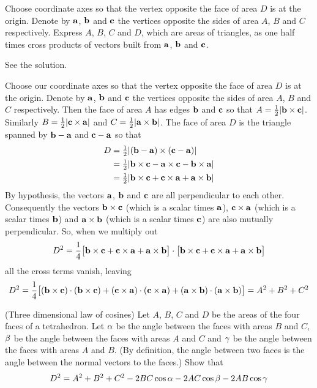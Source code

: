 \begin{hint}
Choose coordinate axes so that the vertex opposite
the face of area $D$ is at the origin. Denote  by $\mathbf{a}$, $\mathbf{b}$ and
$\mathbf{c}$ the vertices opposite the sides of area $A$, $B$ and $C$ respectively.
Express $A$, $B$, $C$ and $D$, which are areas of triangles, as one half 
times cross products of vectors built from $\mathbf{a}$, $\mathbf{b}$ and $\mathbf{c}$.
\end{hint}

\begin{answer}
See the solution.
\end{answer}

\begin{solution}
Choose our coordinate axes so that the vertex opposite
the face of area $D$ is at the origin. Denote  by $\mathbf{a}$, $\mathbf{b}$ and
$\mathbf{c}$ the vertices opposite the sides of area $A$, $B$ and $C$ respectively.
Then the face of area $A$ has edges $\mathbf{b}$ and $\mathbf{c}$ so that
$A=\tfrac{1}{2} |\mathbf{b}\times\mathbf{c}|$. Similarly $B=\tfrac{1}{2}|\mathbf{c}\times\mathbf{a}|$ and
$C=\tfrac{1}{2}|\mathbf{a}\times \mathbf{b}|$. The face of area $D$ is the triangle 
spanned by $\mathbf{b}-\mathbf{a}$ and $\mathbf{c}-\mathbf{a}$ so that
\begin{align*}
D&=\tfrac{1}{2}|(\mathbf{b}-\mathbf{a})\times(\mathbf{c}-\mathbf{a})|\cr
&=\tfrac{1}{2}|\mathbf{b}\times \mathbf{c}-\mathbf{a}\times\mathbf{c}-\mathbf{b}\times\mathbf{a}|\\
&=\tfrac{1}{2}|\mathbf{b}\times \mathbf{c}+\mathbf{c}\times\mathbf{a}+\mathbf{a}\times\mathbf{b}|
\end{align*} 
By hypothesis, the vectors $\mathbf{a}$, $\mathbf{b}$ and $\mathbf{c}$ are all perpendicular
to each other. Consequently the vectors $\mathbf{b}\times \mathbf{c}$ (which is
a scalar times $\mathbf{a}$), $\mathbf{c}\times\mathbf{a}$ (which is a scalar times
$\mathbf{b}$) and $\mathbf{a}\times\mathbf{b}$ (which is a scalar times $\mathbf{c}$)
are also mutually perpendicular. So, when we multiply out
\begin{equation*}
D^2=\frac{1}{4}\big[\mathbf{b}\times \mathbf{c}+\mathbf{c}\times\mathbf{a}+\mathbf{a}\times\mathbf{b}\big]\cdot\big[\mathbf{b}\times \mathbf{c}+\mathbf{c}\times\mathbf{a}+\mathbf{a}\times\mathbf{b}\big]
\end{equation*}
all the cross terms vanish, leaving
\begin{equation*}
D^2=\frac{1}{4}\big[(\mathbf{b}\times \mathbf{c})\cdot(\mathbf{b}\times \mathbf{c})
+(\mathbf{c}\times\mathbf{a})\cdot(\mathbf{c}\times\mathbf{a})
+(\mathbf{a}\times\mathbf{b})\cdot(\mathbf{a}\times\mathbf{b})\big]=A^2+B^2+C^2
\end{equation*}
\end{solution}

\begin{question}
(Three dimensional law of cosines)  Let $A$, $B$, $C$ and
$D$ be the areas of the four faces of a tetrahedron. Let 
$\alpha$ be the angle between the faces with areas $B$ and $C$, 
$\beta$ be the angle between the faces with areas $A$ and $C$ and 
$\gamma$ be the angle between the faces with areas $A$ and $B$. 
(By definition, the angle between two faces is the angle between the normal vectors to the faces.)
 Show that 
\begin{equation*}
D^2=A^2+B^2+C^2-2BC\cos\alpha-2AC\cos\beta-2AB\cos\gamma
\end{equation*}
\end{question}

